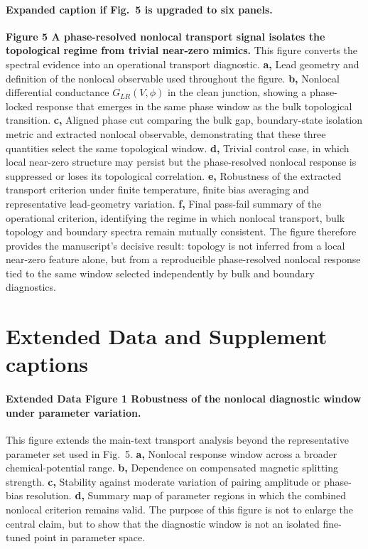 \paragraph{Expanded caption if Fig.~5 is upgraded to six panels.}
\textbf{Figure 5 \textbar{} A phase-resolved nonlocal transport signal isolates the topological regime from trivial near-zero mimics.} This figure converts the spectral evidence into an operational transport diagnostic. \textbf{a,} Lead geometry and definition of the nonlocal observable used throughout the figure. \textbf{b,} Nonlocal differential conductance $G_{LR}(V,\phi)$ in the clean junction, showing a phase-locked response that emerges in the same phase window as the bulk topological transition. \textbf{c,} Aligned phase cut comparing the bulk gap, boundary-state isolation metric and extracted nonlocal observable, demonstrating that these three quantities select the same topological window. \textbf{d,} Trivial control case, in which local near-zero structure may persist but the phase-resolved nonlocal response is suppressed or loses its topological correlation. \textbf{e,} Robustness of the extracted transport criterion under finite temperature, finite bias averaging and representative lead-geometry variation. \textbf{f,} Final pass-fail summary of the operational criterion, identifying the regime in which nonlocal transport, bulk topology and boundary spectra remain mutually consistent. The figure therefore provides the manuscript's decisive result: topology is not inferred from a local near-zero feature alone, but from a reproducible phase-resolved nonlocal response tied to the same window selected independently by bulk and boundary diagnostics. 

\section*{Extended Data and Supplement captions}

\paragraph{Extended Data Figure 1 \textbar{} Robustness of the nonlocal diagnostic window under parameter variation.}
This figure extends the main-text transport analysis beyond the representative parameter set used in Fig.~5. \textbf{a,} Nonlocal response window across a broader chemical-potential range. \textbf{b,} Dependence on compensated magnetic splitting strength. \textbf{c,} Stability against moderate variation of pairing amplitude or phase-bias resolution. \textbf{d,} Summary map of parameter regions in which the combined nonlocal criterion remains valid. The purpose of this figure is not to enlarge the central claim, but to show that the diagnostic window is not an isolated fine-tuned point in parameter space.

